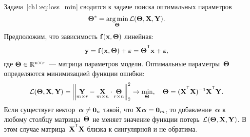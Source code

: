 \documentclass[11pt, a5paper]{dissert}
\begin{document}
Задача~\eqref{ch1:eq:loss_min} сводится к задаче поиска оптимальных параметров
\begin{equation}
	\boldsymbol{\Theta}^* = \mathop{\arg \min}\limits_{\boldsymbol{\Theta}} \mathcal{L}(\boldsymbol{\Theta}, \mathbf{X}, \mathbf{Y}).
	\label{ch1:eq:loss_min_param}
\end{equation}
Предположим, что зависимость $\mathbf{f}(\mathbf{x}, \boldsymbol{\Theta})$ линейная:
\begin{equation}
	\by = \mathbf{f}(\bx, \bTheta) + \bepsilon = \bTheta^{\T} \bx+ \bepsilon,
	\label{ch1:eq:lin_reg_model}
\end{equation}
где $\boldsymbol{\Theta} \in \mathbb{R}^{n \times r}$~--- матрица параметров модели.
Оптимальные параметры~$\boldsymbol{\Theta}$ определяются минимизацией функции ошибки:
\begin{equation}
	\cL(\bTheta, \bX, \bY) = {\left\| \underset{m \times r}{\mathbf{Y}}  - \underset{m \times n}{\bX} \cdot \underset{r \times n}{\bTheta} \right\| }_2^2 \rightarrow\min_{\bTheta}, \quad 
	\bTheta = (\bX^{\T} \bX)^{-1} \bX^{\T} \bY.
	\label{ch1:eq:l2_loss_function}
\end{equation}
Если существует вектор~$\boldsymbol{\alpha} \neq \boldsymbol{0}_n$ такой, что $\mathbf{X} \boldsymbol{\alpha}= \boldsymbol{0}_m$, то добавление~$\boldsymbol{\alpha}$ к любому столбцу матрицы~$\boldsymbol{\Theta}$ не меняет значение функции потерь~$\mathcal{L}(\boldsymbol{\Theta}, \mathbf{X}, \mathbf{Y})$.
В этом случае матрица~$\bX^{\T} \bX$ близка к сингулярной и не обратима.
\end{document}
